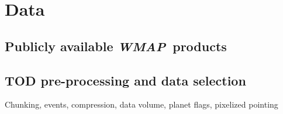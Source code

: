 \documentclass[twocolumn]{../../common/aa}
\def\WMAP{\emph{WMAP}}
\newcommand{\BP}{\textsc{BeyondPlanck}}
\begin{document}



\clearpage

\section{Data}
\label{sec:data}

\subsection{Publicly available \WMAP\ products}
\label{sec:products}

\subsection{TOD pre-processing and data selection}
\label{sec:preprocessing}

Chunking, events, compression, data volume, planet flags, pixelized pointing
\end{document}
